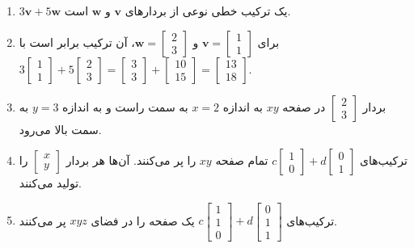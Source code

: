 \documentclass[12pt, a4paper]{book}
\begin{document}
	\begin{enumerate}
		\item $3\mathbf{v} + 5\mathbf{w}$ یک ترکیب خطی نوعی از بردارهای $\mathbf{v}$ و $\mathbf{w}$ است.
		\item برای $\mathbf{v} = \begin{bmatrix} 1 \\ 1 \end{bmatrix}$ و $\mathbf{w} = \begin{bmatrix} 2 \\ 3 \end{bmatrix}$، آن ترکیب برابر است با $3\begin{bmatrix} 1 \\ 1 \end{bmatrix} + 5\begin{bmatrix} 2 \\ 3 \end{bmatrix} = \begin{bmatrix} 3 \\ 3 \end{bmatrix} + \begin{bmatrix} 10 \\ 15 \end{bmatrix} = \begin{bmatrix} 13 \\ 18 \end{bmatrix}$.
		\item بردار $\begin{bmatrix} 2 \\ 3 \end{bmatrix}$ در صفحه $xy$ به اندازه $x=2$ به سمت راست و به اندازه $y=3$ به سمت بالا می‌رود.
		\item ترکیب‌های $c\begin{bmatrix} 1 \\ 0 \end{bmatrix} + d\begin{bmatrix} 0 \\ 1 \end{bmatrix}$ تمام صفحه $xy$ را پر می‌کنند. آن‌ها هر بردار $\begin{bmatrix} x \\ y \end{bmatrix}$ را تولید می‌کنند.
		\item ترکیب‌های $c\begin{bmatrix} 1 \\ 1 \\ 0 \end{bmatrix} + d\begin{bmatrix} 0 \\ 1 \\ 1 \end{bmatrix}$ یک صفحه را در فضای $xyz$ پر می‌کنند.

\end{enumerate}
\end{document}
